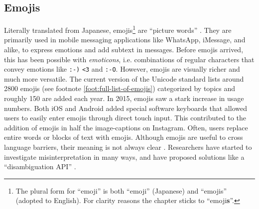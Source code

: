 \subsection{Emojis}
Literally translated from Japanese, emojis\footnote{The plural form for ``emoji'' is both ``emoji'' (Japanese) and ``emojis'' (adopted to English). For clarity reasons the chapter sticks to ``emoji\textbf{s}''.} are ``picture words'' \cite{Taggart2015NewWords}. They are primarily used in mobile messaging applications like WhatsApp, iMessage, and alike, to express emotions and add subtext in messages. Before emojis arrived, this has been possible with \textit{emoticons}, i.e. combinations of regular characters that convey emotions like \texttt{:-)} \texttt{<3} and \texttt{:-O}. However, emojis are visually richer and much more versatile. The current version of the Unicode standard lists around 2800 emojis (see footnote \ref{foot:full-list-of-emojis}) categorized by topics and roughly 150 are added each year. In 2015, emojis saw a stark increase in usage numbers. Both iOS and Android added special software keyboards that allowed users to easily enter emojis through direct touch input. This contributed to the addition of emojis in half the image-captions on Instagram. Often, users replace entire words or blocks of text with emojis. Although emojis are useful to cross language barriers, their meaning is not always clear \cite{Miller2015BlissfullyHappyEmoji,Tigwell2016EmojiMisunderstandings}. Researchers have started to investigate misinterpretation in many ways, and have proposed solutions like a ``disambiguation API'' \cite{Wijeratne2010}. 

